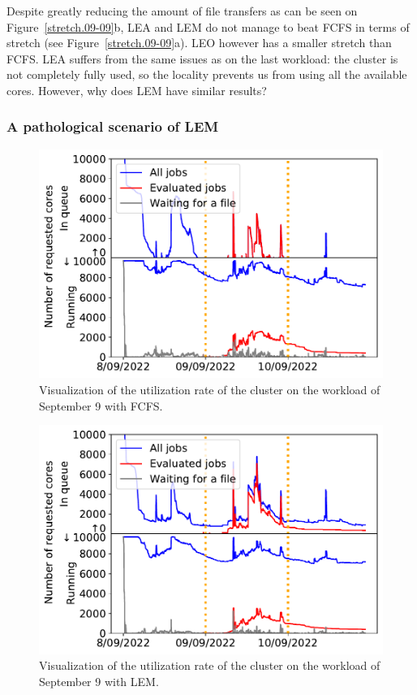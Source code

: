 \documentclass[conference,10pt]{IEEEtran}
\begin{document}
Despite greatly reducing the amount of file transfers as can be seen on Figure~\ref{stretch.09-09}b, LEA and LEM
do not manage to beat FCFS in terms of stretch (see Figure~\ref{stretch.09-09}a). 
LEO however has a smaller stretch than FCFS. 
LEA suffers from the same issues as on the last workload: the cluster is
not completely fully used, so 
the locality prevents us from using all the available cores.
However, why does LEM have similar results?

\subsubsection{A pathological scenario of LEM}

\begin{figure}[t]\centering\includegraphics[width=0.9\linewidth]{../MBSS/plot/Cluster_usage/2022-09-09->2022-09-09_V10000_Fcfs_Used_nodes_Reduced_450_128_32_256_4_1024_core_by_core.pdf}\caption{Visualization of the utilization rate of the cluster on the workload of September 9 with FCFS.}\label{cluster_09-09_fcfs}\end{figure}
\begin{figure}[t]\centering\includegraphics[width=0.9\linewidth]{../MBSS/plot/Cluster_usage/2022-09-09->2022-09-09_V10000_Fcfs_with_a_score_mixed_strategy_x500_x1_x0_x0_Used_nodes_Reduced_450_128_32_256_4_1024_core_by_core.pdf}\caption{Visualization of the utilization rate of the cluster on the workload of September 9 with LEM.}\label{cluster_09-09_lem}
\end{figure}
\end{document}
